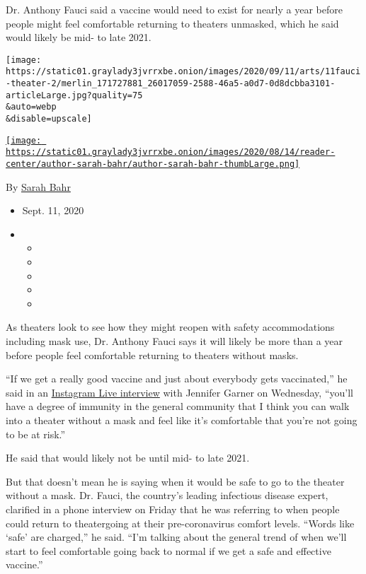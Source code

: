 Dr. Anthony Fauci said a vaccine would need to exist for nearly a year
before people might feel comfortable returning to theaters unmasked,
which he said would likely be mid- to late 2021.

\texttt{[image: https://static01.graylady3jvrrxbe.onion/images/2020/09/11/arts/11fauci-theater-2/merlin\_171727881\_26017059-2588-46a5-a0d7-0d8dcbba3101-articleLarge.jpg?quality=75\\\&auto=webp\\\&disable=upscale]}

\href{https://www.nytimes3xbfgragh.onion/by/sarah-bahr}{\texttt{[image: https://static01.graylady3jvrrxbe.onion/images/2020/08/14/reader-center/author-sarah-bahr/author-sarah-bahr-thumbLarge.png]}}

By \href{https://www.nytimes3xbfgragh.onion/by/sarah-bahr}{Sarah Bahr}

\begin{itemize}
\item
  Sept. 11, 2020
\item
  \begin{itemize}
  \item
  \item
  \item
  \item
  \item
  \end{itemize}
\end{itemize}

As theaters look to see how they might reopen with safety accommodations
including mask use, Dr. Anthony Fauci says it will likely be more than a
year before people feel comfortable returning to theaters without masks.

``If we get a really good vaccine and just about everybody gets
vaccinated,'' he said in an
\href{https://www.instagram.com/p/CE7tWzinTI8/}{Instagram Live
interview} with Jennifer Garner on Wednesday, ``you'll have a degree of
immunity in the general community that I think you can walk into a
theater without a mask and feel like it's comfortable that you're not
going to be at risk.''

He said that would likely not be until mid- to late 2021.

But that doesn't mean he is saying when it would be safe to go to the
theater without a mask. Dr. Fauci, the country's leading infectious
disease expert, clarified in a phone interview on Friday that he was
referring to when people could return to theatergoing at their
pre-coronavirus comfort levels. ``Words like `safe' are charged,'' he
said. ``I'm talking about the general trend of when we'll start to feel
comfortable going back to normal if we get a safe and effective
vaccine.''

